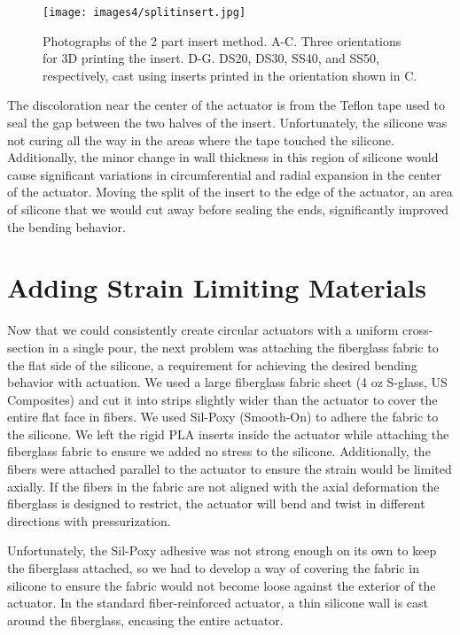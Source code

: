 \begin{figure}[ht!]
    \centering
    \texttt{[image: images4/splitinsert.jpg]}
    \caption{Photographs of the 2 part insert method. A-C. Three orientations for 3D printing the insert. D-G. DS20, DS30, SS40, and SS50, respectively, cast using inserts printed in the orientation shown in C.}
    \label{fig:splitinsert}
\end{figure}

The discoloration near the center of the actuator is from the Teflon tape used to seal the gap between the two halves of the insert. Unfortunately, the silicone was not curing all the way in the areas where the tape touched the silicone. Additionally, the minor change in wall thickness in this region of silicone would cause significant variations in circumferential and radial expansion in the center of the actuator. Moving the split of the insert to the edge of the actuator, an area of silicone that we would cut away before sealing the ends, significantly improved the bending behavior. 

\clearpage
\section{Adding Strain Limiting Materials}

Now that we could consistently create circular actuators with a uniform cross-section in a single pour, the next problem was attaching the fiberglass fabric to the flat side of the silicone, a requirement for achieving the desired bending behavior with actuation. We used a large fiberglass fabric sheet (4 oz S-glass, US Composites) and cut it into strips slightly wider than the actuator to cover the entire flat face in fibers. We used Sil-Poxy (Smooth-On) to adhere the fabric to the silicone. We left the rigid PLA inserts inside the actuator while attaching the fiberglass fabric to ensure we added no stress to the silicone. Additionally, the fibers were attached parallel to the actuator to ensure the strain would be limited axially. If the fibers in the fabric are not aligned with the axial deformation the fiberglass is designed to restrict, the actuator will bend and twist in different directions with pressurization. 

Unfortunately, the Sil-Poxy adhesive was not strong enough on its own to keep the fiberglass attached, so we had to develop a way of covering the fabric in silicone to ensure the fabric would not become loose against the exterior of the actuator. In the standard fiber-reinforced actuator, a thin silicone wall is cast around the fiberglass, encasing the entire actuator. 

